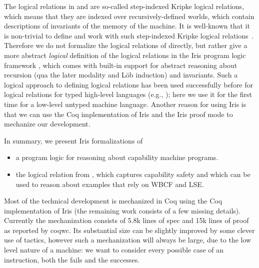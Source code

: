 \documentclass[sigplan,review]{acmart}\settopmatter{printfolios=true,printccs=false,printacmref=false}
\begin{document}
The logical relations in \cite{skorstengaardESOP18} and \cite{SkorstengaardPOPL19} are so-called step-indexed Kripke logical relations, which means that they are indexed over recursively-defined worlds, which contain descriptions of invariants of the memory of the machine.
It is well-known that it is non-trivial to define and work with such step-indexed Kripke logical relations~\cite{ahmed-2002, birkedal2011step}.
Therefore we do not formalize the logical relations of \citeauthor{skorstengaardESOP18} 
directly, but rather give a more abstract \emph{logical} definition of the logical relations in the Iris program logic framework \cite{iris,iris2,iris3, iris-jfp}, which comes with built-in support for abstract reasoning about recursion (qua the later modality and L{\"o}b induction) and invariants.
Such a logical approach to defining logical relations has been used successfully before for logical relations for typed high-level languages (e.g., \cite{lslr-journal,iris:type-effect,rustbelt,runst-popl18}); here we use it for the first time for a low-level untyped machine language.
Another reason for using Iris is that we can use the Coq implementation of Iris and
the Iris proof mode \cite{Krebbers:2017} to mechanize our development. 

In summary, we present Iris formalizations of 
\begin{itemize}
  \item a program logic for reasoning about capability machine programs.
  \item the logical relation from \cite{skorstengaardESOP18}, 
    which captures capability safety and which can be used to reason about examples
    that rely on WBCF and LSE.
\end{itemize}
Most of the technical development is mechanized in Coq using the Coq implementation of Iris (the remaining work consists of a few missing details). Currently the mechanization consists of 5.8k lines of spec and 15k lines of proof as reported by \textsf{coqwc}. Its substantial size can be slightly improved by some clever use of tactics, however such a mechanization will always be large, due to the low level nature of a machine: we want to consider every possible case of an instruction, both the fails and the successes.

\end{document}
